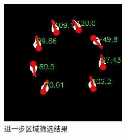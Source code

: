 \documentclass[a4paper]{ctexart}
\begin{document}
\begin{figure}[htbp]
\begin{minipage}[t]{0.25\textwidth}
		\includegraphics[width=\textwidth]{figure/point_to/img5.jpg}
	\end{minipage}
	\caption{进一步区域筛选结果}\label{fig:进一步筛选结果}
\end{figure}
\end{document}
